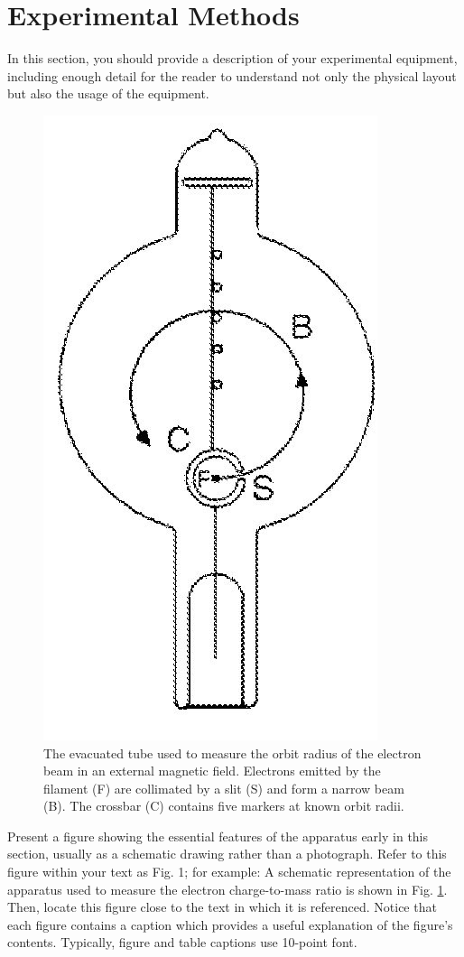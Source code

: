 \section{Experimental Methods} \label{sec:experiment}

In this section, you should provide a description of your experimental equipment, including enough detail for the reader to understand not only the physical layout but also the usage of the equipment.

\begin{figure}[ht]
    \centering
    \includegraphics[width=0.4\linewidth]{figures/evacuated_tube.png}
    \caption{\footnotesize The evacuated tube used to measure the orbit radius of the electron beam in an external magnetic field. Electrons emitted by the filament (F) are collimated by a slit (S) and form a narrow beam (B). The crossbar (C) contains five markers at known orbit radii.}
    \label{fig:evacuated_tube}
\end{figure}

Present a figure showing the essential features of the apparatus early in this section, usually as a schematic drawing rather than a photograph. Refer to this figure within your text as Fig. 1; for example: A schematic representation of the apparatus used to measure the electron charge-to-mass ratio is shown in Fig. \ref{fig:evacuated_tube}. Then, locate this figure close to the text in which it is referenced. Notice that each figure contains a caption which provides a useful explanation of the figure's contents. Typically, figure and table captions use 10-point font.